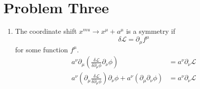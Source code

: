 \documentclass{article}
\numberwithin{equation}{section}
\begin{document}
\section{Problem Three}
\begin{enumerate}[label=(\alph*)]
    \item The coordinate shift $x^{mu} \to x^{\mu}+a^{\mu}$ is a symmetry if 
    \begin{equation}
        \delta \mathcal{L} = \partial_{\mu}f^{\mu}
    \end{equation}
    for some function $f^{\mu}.$
    \begin{align}
        a^\nu \partial_{\mu} \left(\frac{\delta \mathcal{L}}{\delta \partial_\mu \phi}\partial_\nu \phi\right) &= a^\nu \partial_\nu \mathcal{L} \\ 
        a^{\nu}\left(\partial_\mu \frac{\delta \mathcal{L}}{\delta \partial_\mu \phi} \right)\partial_\nu\phi + a^{\nu}\left(\partial_{\mu}\partial_{\nu}\phi\right)&= a^\nu \partial_\nu \mathcal{L}
    \end{align}
\end{enumerate}
\end{document}
